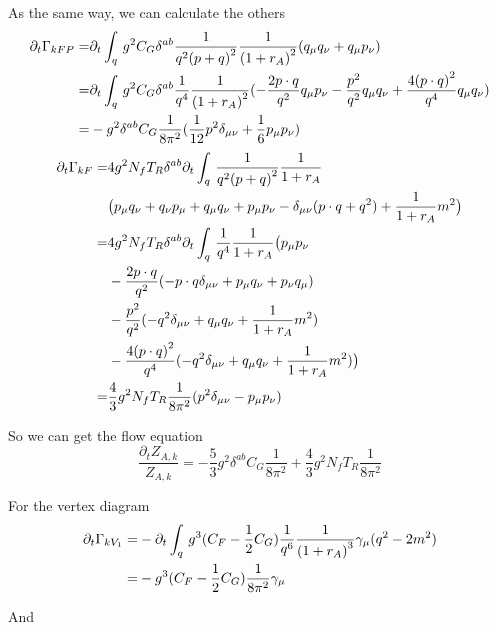 \documentclass[UTF8]{ctexart}
\begin{document}
\par As the same way, we can calculate the others
\begin{align}
\partial_{t}\Gamma_{kFP}
=&\partial_{t}\int_{q}\,g^2 C_{G}\delta^{ab}\frac{1}{q^{2}{(p+q)}^2}{\frac{1}{{(1+r_{A})}^2}}(q_{\mu}q_{\nu}+q_{\mu}p_{\nu})
\notag\\=&\partial_{t}\int_{q}\,g^{2}C_{G}\delta^{ab}\frac{1}{q^4}\frac{1}{{(1+r_{A})}^2}(-\frac{2p\cdot q}{q^2}q_{\mu}p_{\nu}-\frac{p^2}{q^2}q_{\mu}q_{\nu}+\frac{4{(p\cdot q)}^2}{q^4}q_{\mu}q_{\nu})
\notag\\=&-g^{2}\delta^{ab}C_{G}\frac{1}{8\pi^2}(\frac{1}{12}p^{2}\delta_{\mu\nu}+\frac{1}{6}p_{\mu}p_{\nu})
\end{align}
\begin{align}
\partial_{t}\Gamma_{kF}
=&4g^{2}N_{f}T_{R}\delta^{ab}\partial_{t}\int_{q}\,\frac{1}{q^{2}{(p+q)}^2}{\frac{1}{1+r_{A}}}
\notag\\&\big(p_{\mu}q_{\nu}+q_{\nu}p_{\mu}+q_{\mu}q_{\nu}+p_{\mu}p_{\nu}-\delta_{\mu\nu}(p\cdot q+q^2)+{\frac{1}{1+r_{A}}}m^{2}\big)
\notag\\=&4g^{2}N_{f}T_{R}\delta^{ab}\partial_{t}\int_{q}\,\frac{1}{q^{4}}{\frac{1}{1+r_{A}}}\big(p_{\mu}p_{\nu}
\notag\\&-\frac{2p\cdot q}{q^2}(-p\cdot q\delta_{\mu\nu}+p_{\mu}q_{\nu}+p_{\nu}q_{\mu})
\notag\\&-\frac{p^2}{q^2}(-q^{2}\delta_{\mu\nu}+q_{\mu}q_{\nu}+{\frac{1}{1+r_{A}}}m^{2})
\notag\\&-\frac{4{(p\cdot q)}^2}{q^4}(-q^{2}\delta_{\mu\nu}+q_{\mu}q_{\nu}+{\frac{1}{1+r_{A}}}m^{2})\big)
\notag\\=&\frac{4}{3}g^{2}N_{f}T_{R}\frac{1}{8\pi^2}(p^{2}\delta_{\mu\nu}-p_{\mu}p_{\nu})
\end{align}
\par So we can get the flow equation
\begin{equation}
\frac{\partial_{t}Z_{A,k}}{Z_{A,k}}=-\frac{5}{3}g^{2}\delta^{ab}C_{G}\frac{1}{8\pi^2}+\frac{4}{3}g^{2}N_{f}T_{R}\frac{1}{8\pi^2}
\end{equation}
\par For the vertex diagram
\begin{align}
\partial_{t}\Gamma_{kV_1}
=&-\partial_{t}\int_{q}\,g^3 (C_{F}-\frac{1}{2}C_{G})\frac{1}{q^6}\frac{1}{{(1+r_{A})}^3}\gamma_{\mu}(q^{2}-2m^{2})
\notag\\=&-g^{3}(C_{F}-\frac{1}{2}C_{G})\frac{1}{8{\pi}^2}\gamma_{\mu}
\end{align}
\par And
\end{document}
